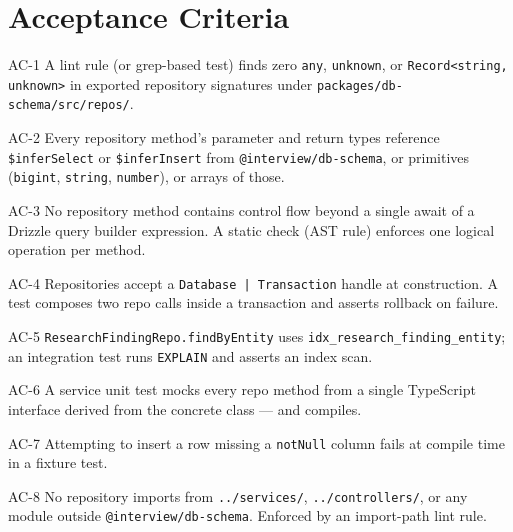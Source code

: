 \section{Acceptance Criteria}

\begin{ac}{AC-1}
A lint rule (or grep-based test) finds zero \texttt{any}, \texttt{unknown}, or
\texttt{Record<string, unknown>} in exported repository signatures under
\texttt{packages/db-schema/src/repos/}.
\end{ac}

\begin{ac}{AC-2}
Every repository method's parameter and return types reference
\texttt{\$inferSelect} or \texttt{\$inferInsert} from
\texttt{@interview/db-schema}, or primitives (\texttt{bigint},
\texttt{string}, \texttt{number}), or arrays of those.
\end{ac}

\begin{ac}{AC-3}
No repository method contains control flow beyond a single await of a Drizzle
query builder expression. A static check (AST rule) enforces one logical
operation per method.
\end{ac}

\begin{ac}{AC-4}
Repositories accept a \texttt{Database | Transaction} handle at construction.
A test composes two repo calls inside a transaction and asserts rollback on
failure.
\end{ac}

\begin{ac}{AC-5}
\texttt{ResearchFindingRepo.findByEntity} uses
\texttt{idx\_research\_finding\_entity}; an integration test runs
\texttt{EXPLAIN} and asserts an index scan.
\end{ac}

\begin{ac}{AC-6}
A service unit test mocks every repo method from a single TypeScript
interface derived from the concrete class --- and compiles.
\end{ac}

\begin{ac}{AC-7}
Attempting to insert a row missing a \texttt{notNull} column fails at compile
time in a fixture test.
\end{ac}

\begin{ac}{AC-8}
No repository imports from \texttt{../services/}, \texttt{../controllers/}, or
any module outside \texttt{@interview/db-schema}. Enforced by an import-path
lint rule.
\end{ac}

